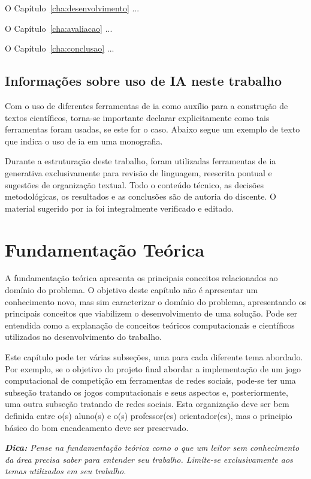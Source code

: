 \documentclass{eic-bcc-tcc}
\begin{document}
O Capítulo~\ref{cha:desenvolvimento} ...

O Capítulo~\ref{cha:avaliacao} ...

O Capítulo~\ref{cha:conclusao} ...

\section{Informações sobre uso de IA neste trabalho}

Com o uso de diferentes ferramentas de \gls{ia} como auxílio para a construção de textos científicos, torna-se importante declarar explicitamente como tais ferramentas foram usadas, se este for o caso. Abaixo segue um exemplo de texto que indica o uso de \gls{ia} em uma monografia.

Durante a estruturação deste trabalho, foram utilizadas ferramentas de \gls{ia} generativa exclusivamente para revisão de linguagem, reescrita pontual e sugestões de organização textual. Todo o conteúdo técnico, as decisões metodológicas, os resultados e as conclusões são de autoria do discente. O material sugerido por \gls{ia} foi integralmente verificado e editado.


\chapter{Fundamentação Teórica}
\label{cha:fundamentacao}

A fundamentação teórica apresenta os principais conceitos relacionados ao domínio do problema. O objetivo deste capítulo não é apresentar um conhecimento novo, mas sim caracterizar o domínio do problema, apresentando os principais conceitos que viabilizem o desenvolvimento de uma solução. Pode ser entendida como a explanação de conceitos teóricos computacionais e científicos utilizados no desenvolvimento do trabalho.

Este capítulo pode ter várias subseções, uma para cada diferente tema abordado. Por exemplo, se o objetivo do projeto final abordar a implementação de um jogo computacional de competição em ferramentas de redes sociais, pode-se ter uma subseção tratando os jogos computacionais e seus aspectos e, posteriormente, uma outra subseção tratando de redes sociais. Esta organização deve ser bem definida entre o(s) aluno(s) e o(s) professor(es) orientador(es), mas o principio básico do bom encadeamento deve ser preservado.

\textit{\textbf{Dica:} Pense na fundamentação teórica como o que um leitor sem conhecimento da área precisa saber para entender seu trabalho. Limite-se exclusivamente aos temas utilizados em seu trabalho.}
\end{document}
